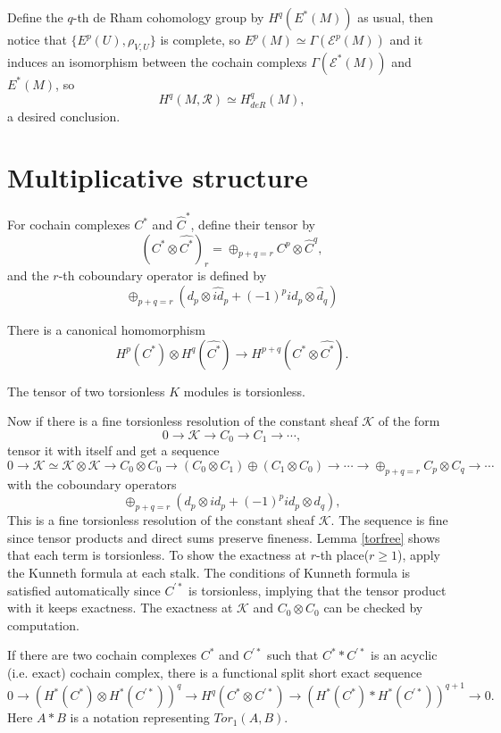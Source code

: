 \documentclass[twoside]{article}
\begin{document}
 Define the $q$-th de Rham cohomology group by $H^q(E^*(M))$ as usual,
 then notice that $\{E^p(U),\rho_{V,U}\}$ is complete, so $E^p(M)\simeq \Gamma(\mathscr{E}^p(M))$ and it induces an isomorphism  between the cochain complexs  $\Gamma(\mathscr{E}^*(M))$ and $E^*(M)$, so  $$
 H^q(M,\mathscr{R})\simeq H^q_{deR}(M),
 $$
a desired conclusion.

\section{Multiplicative structure}
\begin{definition}
  For cochain complexes $C^*$ and $\hat{C}^*$,  define their tensor by $$
  (C^*\otimes \hat{C^*})_r=\oplus_{p+q=r}C^p\otimes \hat{C}^q,
  $$
  and the $r$-th coboundary operator is defined by $$
  \oplus_{p+q=r}(d_p\otimes \hat{id}_p+(-1)^p{id}_p\otimes \hat{d}_q)
  $$
\end{definition}
There is  a canonical homomorphism $$
H^p(C^*)\otimes H^q(\hat{C^*})\to H^{p+q}(C^*\otimes \hat{C^*}).
$$

\begin{lemma}\label{torfree}
  The tensor of two torsionless $K$ modules is torsionless.

\end{lemma}

Now if there is a fine torsionless resolution of the constant sheaf $\mathscr{K}$ of the form
$$
0\to \mathscr{K}\to C_0\to C_1\to\cdots,
$$
 tensor it with itself and get a sequence $$
0\to \mathscr{K}\simeq \mathscr{K}\otimes \mathscr{K}\to C_0\otimes C_0\to (C_0\otimes C_1)\oplus (C_1\otimes C_0)\to \cdots \to \oplus_{p+q=r}C_p\otimes C_q\to \cdots
$$
with the coboundary operators $$
  \oplus_{p+q=r}(d_p\otimes {id}_p+(-1)^p{id}_p\otimes d_q),
  $$
This is a fine torsionless resolution of the constant sheaf $\mathscr{K}$. The sequence is fine since  tensor products and direct sums preserve fineness. Lemma \ref{torfree} shows that each term is torsionless. To show the exactness at $r$-th place($r\geq 1 $),  apply the Kunneth formula at each stalk. The conditions of Kunneth formula is satisfied automatically since $C^{\prime*}$ is torsionless, implying that the tensor product with it keeps exactness. The exactness at $\mathscr{K}$ and $C_0\otimes C_0$ can be  checked by computation.

\begin{theorem}
If there are two cochain complexes $C^*$ and $C^{\prime *}$ such that $C^**C^{\prime *}$ is an acyclic (i.e. exact) cochain complex, there is a functional split short exact sequence $$
0\to (H^*(C^*)\otimes H^*(C^{\prime *}))^q\to H^q(C^*\otimes C^{\prime *})\to ( H^*(C^*)*H^*(C^{\prime *})  )^{q+1}\to 0.
$$
Here $A*B$ is a notation representing $Tor_1(A,B)$.
\end{theorem}
\end{document}
